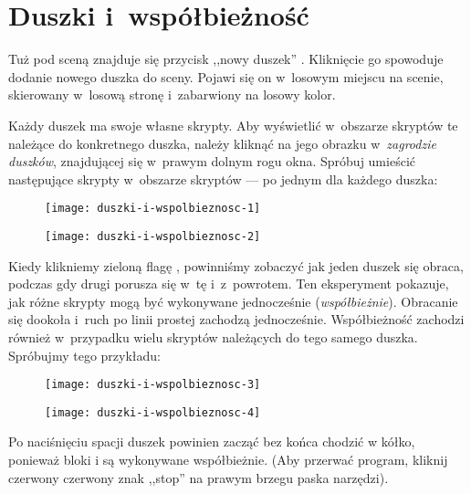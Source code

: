 \documentclass{report}
\begin{document}

\section{Duszki i~współbieżność}

Tuż pod sceną znajduje się przycisk ,,nowy duszek'' . Kliknięcie go spowoduje dodanie nowego duszka do sceny. Pojawi się on w~losowym miejscu na scenie, skierowany w~losową stronę i~zabarwiony na losowy kolor.

Każdy duszek ma swoje własne skrypty. Aby wyświetlić w~obszarze skryptów te należące do konkretnego duszka, należy kliknąć na jego obrazku w~\emph{zagrodzie duszków}, znajdującej się w~prawym dolnym rogu okna. Spróbuj umieścić następujące skrypty w~obszarze skryptów --- po jednym dla każdego duszka:

\begin{figure}[H]
\begin{minipage}{0.5\textwidth}
\centering
\texttt{[image: duszki-i-wspolbieznosc-1]}
\end{minipage}%
\begin{minipage}{0.5\textwidth}
\centering
\texttt{[image: duszki-i-wspolbieznosc-2]}
\end{minipage}
\end{figure}

Kiedy klikniemy zieloną flagę , powinniśmy zobaczyć jak jeden duszek się obraca, podczas gdy drugi porusza się w~tę i~z~powrotem. Ten eksperyment pokazuje, jak różne skrypty mogą być wykonywane jednocześnie (\emph{współbieżnie}). Obracanie się dookoła i~ruch po linii prostej zachodzą jednocześnie. Współbieżność zachodzi również w~przypadku wielu skryptów należących do tego samego duszka. Spróbujmy tego przykładu:

\begin{figure}[H]
\begin{minipage}{0.5\textwidth}
\centering
\texttt{[image: duszki-i-wspolbieznosc-3]}
\end{minipage}%
\begin{minipage}{0.5\textwidth}
\centering
\texttt{[image: duszki-i-wspolbieznosc-4]}
\end{minipage}
\end{figure}

Po naciśnięciu spacji duszek powinien zacząć bez końca chodzić w kółko, ponieważ bloki  i  są wykonywane współbieżnie. (Aby przerwać program, kliknij czerwony czerwony znak ,,stop''  na prawym brzegu paska narzędzi).
\end{document}
